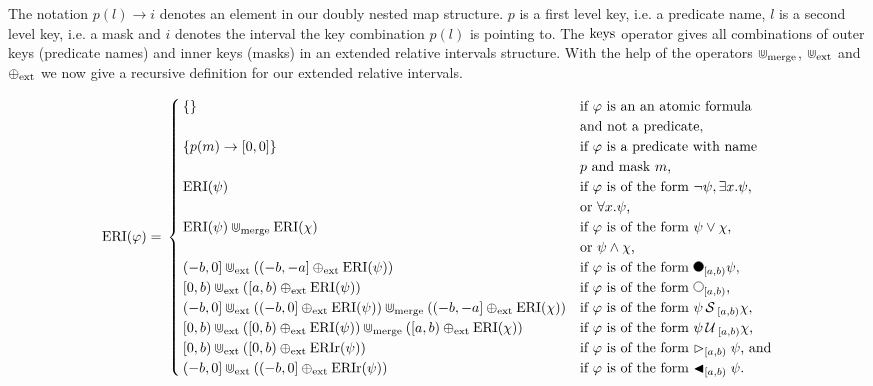 The notation $p(l) \rightarrow i$ denotes an element in our doubly nested map structure.
$p$ is a first level key, i.e. a predicate name, $l$ is a second level key, i.e. a mask and $i$ denotes the interval the key combination $p(l)$ is pointing to.
The $\operatorname{keys}$ operator gives all combinations of outer keys (predicate names) and inner keys (masks) in an extended relative intervals structure.
With the help of the operators $\Cup_{\text{merge}}$, $\Cup_{\text{ext}}$ and $\oplus_{\text{ext}}$ we now give a recursive definition for our extended relative intervals.

\begin{equation*}
    \ERI(\varphi) = \\
    \begin{cases}
        \{\} 
             & \text{if $\varphi$ is an an atomic formula} \\ &\text{and not a predicate,} \\ 
        \{p(m) \rightarrow [0,0]\} 
            & \text{if $\varphi$ is a predicate with name } \\ &\text{$p$ and mask $m$,} \\
        \ERI(\psi) 
            & \text{if $\varphi$ is of the form $\neg \psi, \exists x.\psi$,} \\
            & \text{or $\forall x.\psi$,} \\
        \ERI(\psi) \Cupmerge \ERI(\chi) 
            & \text{if $\varphi$ is of the form $\psi \lor \chi$,} \\ & \text{or $\psi \land \chi$,} \\
        (-b,0] \Cupext ((-b,-a] \oplusext \ERI(\psi)) 
            & \text{if $\varphi$ is of the form $\Previous_{[a,b)}\psi$,} \\
        [0,b) \Cupext ([a,b) \oplusext \ERI(\psi)) 
            & \text{if $\varphi$ is of the form $\Next_{[a,b)}$,}\\
        (-b,0] \Cupext ((-b,0] \oplusext \ERI(\psi)) \Cupmerge ((-b,-a] \oplusext \ERI(\chi)) 
            & \text{if $\varphi$ is of the form $\psi \Since_{[a,b)} \chi$,} \\
        [0,b) \Cupext ([0,b) \oplusext \ERI(\psi)) \Cupmerge ([a,b) \oplusext \ERI(\chi)) 
            & \text{if $\varphi$ is of the form $\psi \Until_{[a,b)} \chi$,} \\
        [0,b) \Cupext ([0,b) \oplusext \ERIr(\psi)) 
            & \text{if $\varphi$ is of the form $\Fregex_{[a,b)} \psi$, and}\\
        (-b,0] \Cupext ((-b,0] \oplusext \ERIr(\psi)) 
            & \text{if $\varphi$ is of the form $\Pregex_{[a,b)} \psi$.}\\
    \end{cases}
\end{equation*}

